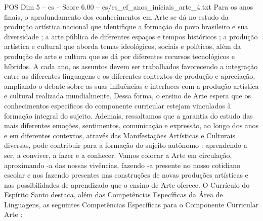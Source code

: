 \begin{textsample}{POS Dim 5 – es – Score 6.00 – es/es\_ef\_anos\_iniciais\_arte\_4.txt}
Para os anos finais, o aprofundamento dos conhecimentos em Arte se dá no estudo da produção artística nacional que identifique a formação do povo brasileiro e sua diversidade ; a arte pública de diferentes espaços e tempos históricos ; a produção artística e cultural que aborda temas ideológicos, sociais e políticos, além da produção de arte e cultura que se dá por diferentes recursos tecnológicos e híbridos.
A cada ano, os assuntos devem ser trabalhados favorecendo a integração entre as diferentes linguagens e os diferentes contextos de produção e apreciação, ampliando o debate sobre as suas influências e interfaces com a produção artística e cultural realizada mundialmente.
Dessa forma, o ensino de Arte espera que os conhecimentos específicos do componente curricular estejam vinculados à formação integral do sujeito.
Ademais, ressaltamos que a garantia do estudo das mais diferentes emoções, sentimentos, comunicação e expressão, ao longo dos anos e em diferentes contextos, através das Manifestações Artísticas e Culturais diversas, pode contribuir para a formação do sujeito autônomo : aprendendo a ser, a conviver, a fazer e a conhecer.
Vamos colocar a Arte em circulação, aproximando -a das nossas vivências, fazendo -a presente no nosso cotidiano escolar e nos fazendo presentes nas construções de novas produções artísticas e nas possibilidades de aprendizado que o ensino de Arte oferece.
O Currículo do Espírito Santo destaca, além das Competências Específicas da Área de Linguagens, as seguintes Competências Específicas para o Componente Curricular Arte :

\end{textsample}
